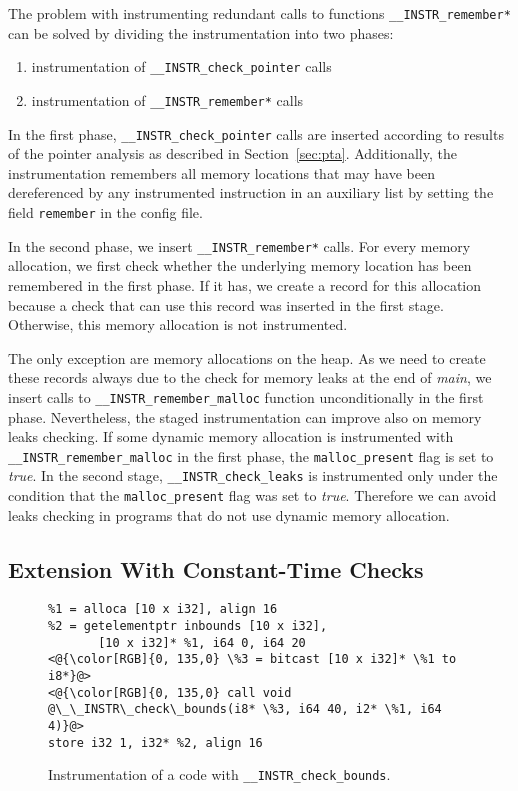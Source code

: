 The problem with instrumenting redundant calls to functions
\texttt{\_\_INSTR\_remember*} can be solved by dividing the instrumentation
into two phases:
\begin{enumerate}
  \item instrumentation of \texttt{\_\_INSTR\_check\_pointer} calls
  \item instrumentation of \texttt{\_\_INSTR\_remember*} calls
\end{enumerate}

In the first phase, \texttt{\_\_INSTR\_check\_pointer} calls are inserted
according to results of the pointer analysis as described in
Section~\ref{sec:pta}. Additionally, the instrumentation remembers all memory
locations that may have been dereferenced by any instrumented instruction in an
auxiliary list by setting the field \texttt{remember} in the config file.

In the second phase, we insert \texttt{\_\_INSTR\_remember*} calls. For every
memory allocation, we first check whether the underlying memory location has
been remembered in the first phase.  If it has, we
create a record for this allocation because a check that can use this record
was inserted in the first stage. Otherwise, this memory allocation is not
instrumented.

The only exception are memory allocations on the heap. As we need to
create these records always due to the check for memory leaks at the
end of \emph{main}, we insert calls to
\texttt{\_\_INSTR\_remember\_malloc} function unconditionally in the
first phase.  Nevertheless, the staged instrumentation can improve
also on memory leaks checking. If some dynamic memory allocation is
instrumented with \texttt{\_\_INSTR\_remember\_malloc} in the first
phase, the \texttt{malloc\_present} flag is set to \emph{true}.  In
the second stage, \texttt{\_\_INSTR\_check\_leaks} is instrumented
only under the condition that the \texttt{malloc\_present} flag was
set to \emph{true}. Therefore we can avoid leaks checking in programs
that do not use dynamic memory allocation.


\subsection{Extension With Constant-Time Checks}\label{sec:constant_time}

\begin{figure}[t]
\begin{lstlisting}
%1 = alloca [10 x i32], align 16
%2 = getelementptr inbounds [10 x i32],
       [10 x i32]* %1, i64 0, i64 20
<@{\color[RGB]{0, 135,0} \%3 = bitcast [10 x i32]* \%1 to i8*}@>
<@{\color[RGB]{0, 135,0} call void @\_\_INSTR\_check\_bounds(i8* \%3, i64 40, i2* \%1, i64 4)}@>
store i32 1, i32* %2, align 16
\end{lstlisting}
\caption{Instrumentation of a code with \texttt{\_\_INSTR\_check\_bounds}.}
\label{fig:check_bounds_example}
\end{figure}

